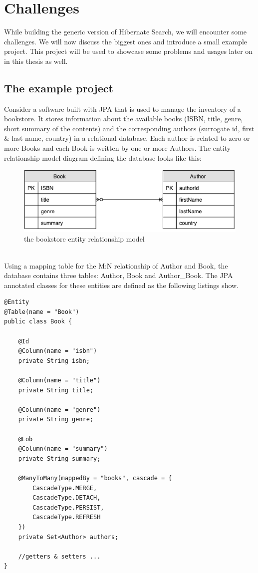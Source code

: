 \section{Challenges}\label{Challenges}
While building the generic version of Hibernate Search, we will encounter some challenges. We will now discuss the biggest ones and introduce a small example project. This project will be used to showcase some problems and usages later on in this thesis as well.

\subsection{The example project} \label{example_project}
Consider a software built with JPA that is used to manage the inventory of a bookstore. It stores information about the available books (ISBN, title, genre, short summary of the contents) and the corresponding authors (surrogate id, first \& last name, country) in a relational database. Each author is related to zero or more Books and each Book is written by one or more Authors. The entity relationship model diagram defining the database looks like this:
\\
\begin{figure}[ht]
	\centering
	\includegraphics[scale = 0.9]{images/Sample_Project_ER.pdf}
	\caption{the bookstore entity relationship model}
	\label{fig3}
\end{figure}
\\
Using a mapping table for the M:N relationship of Author and Book, the database contains three tables: Author, Book and Author\_Book. The JPA annotated classes for these entities are defined as the following listings show.

\pagebreak

\lstset{language=java}
\begin{lstlisting}[frame=htrbl, caption={Book.java}, label={lst:book.java_1}]
@Entity
@Table(name = "Book")
public class Book {

	@Id
	@Column(name = "isbn")
	private String isbn;
	
	@Column(name = "title")
	private String title;
	
	@Column(name = "genre")
	private String genre;
	
	@Lob
	@Column(name = "summary")
	private String summary;
	
	@ManyToMany(mappedBy = "books", cascade = {
		CascadeType.MERGE,
		CascadeType.DETACH,
		CascadeType.PERSIST,
		CascadeType.REFRESH
	})
	private Set<Author> authors;
	
	//getters & setters ...
}
\end{lstlisting}

